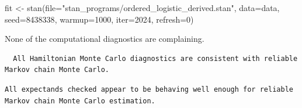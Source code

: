 \documentclass[
  letterpaper,
  DIV=11,
  numbers=noendperiod]{scrartcl}
\newenvironment{Shaded}{\begin{snugshade}}{\end{snugshade}}
\newcommand{\AttributeTok}[1]{\textcolor[rgb]{0.40,0.45,0.13}{#1}}
\newcommand{\ConstantTok}[1]{\textcolor[rgb]{0.56,0.35,0.01}{#1}}
\newcommand{\DecValTok}[1]{\textcolor[rgb]{0.68,0.00,0.00}{#1}}
\newcommand{\FunctionTok}[1]{\textcolor[rgb]{0.28,0.35,0.67}{#1}}
\newcommand{\NormalTok}[1]{\textcolor[rgb]{0.00,0.23,0.31}{#1}}
\newcommand{\OtherTok}[1]{\textcolor[rgb]{0.00,0.23,0.31}{#1}}
\newcommand{\SpecialCharTok}[1]{\textcolor[rgb]{0.37,0.37,0.37}{#1}}
\newcommand{\StringTok}[1]{\textcolor[rgb]{0.13,0.47,0.30}{#1}}
\begin{document}
\begin{Shaded}
\begin{Highlighting}[]
\NormalTok{fit }\OtherTok{\textless{}{-}} \FunctionTok{stan}\NormalTok{(}\AttributeTok{file=}\StringTok{"stan\_programs/ordered\_logistic\_derived.stan"}\NormalTok{,}
            \AttributeTok{data=}\NormalTok{data, }\AttributeTok{seed=}\DecValTok{8438338}\NormalTok{,}
            \AttributeTok{warmup=}\DecValTok{1000}\NormalTok{, }\AttributeTok{iter=}\DecValTok{2024}\NormalTok{, }\AttributeTok{refresh=}\DecValTok{0}\NormalTok{)}
\end{Highlighting}
\end{Shaded}

None of the computational diagnostics are complaining.

\begin{Shaded}
\end{Shaded}

\begin{verbatim}
  All Hamiltonian Monte Carlo diagnostics are consistent with reliable
Markov chain Monte Carlo.
\end{verbatim}

\begin{Shaded}
\end{Shaded}

\begin{verbatim}
All expectands checked appear to be behaving well enough for reliable
Markov chain Monte Carlo estimation.
\end{verbatim}
\end{document}

